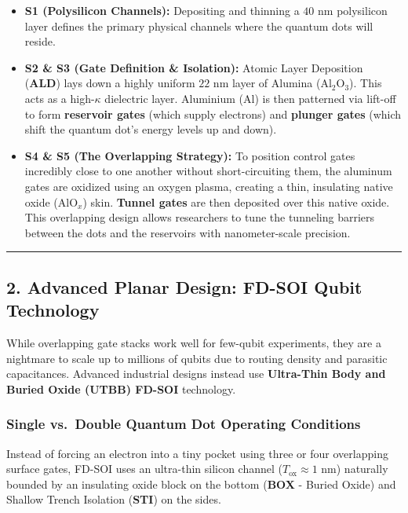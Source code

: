 \documentclass[
]{article}
\providecommand{\tightlist}{%
  \setlength{\itemsep}{0pt}\setlength{\parskip}{0pt}}
\begin{document}
\begin{itemize}
\tightlist
\item
  \textbf{S1 (Polysilicon Channels):} Depositing and thinning a
  \(40\text{ nm}\) polysilicon layer defines the primary physical
  channels where the quantum dots will reside.
\item
  \textbf{S2 \& S3 (Gate Definition \& Isolation):} Atomic Layer
  Deposition (\textbf{ALD}) lays down a highly uniform \(22\text{ nm}\)
  layer of Alumina (\(\text{Al}_2\text{O}_3\)). This acts as a
  high-\(\kappa\) dielectric layer. Aluminium (\(\text{Al}\)) is then
  patterned via lift-off to form \textbf{reservoir gates} (which supply
  electrons) and \textbf{plunger gates} (which shift the quantum dot's
  energy levels up and down).
\item
  \textbf{S4 \& S5 (The Overlapping Strategy):} To position control
  gates incredibly close to one another without short-circuiting them,
  the aluminum gates are oxidized using an oxygen plasma, creating a
  thin, insulating native oxide (\(\text{AlO}_x\)) skin. \textbf{Tunnel
  gates} are then deposited over this native oxide. This overlapping
  design allows researchers to tune the tunneling barriers between the
  dots and the reservoirs with nanometer-scale precision.
\end{itemize}

\begin{center}\rule{0.5\linewidth}{0.5pt}\end{center}

\subsection{2. Advanced Planar Design: FD-SOI Qubit
Technology}\label{advanced-planar-design-fd-soi-qubit-technology}

While overlapping gate stacks work well for few-qubit experiments, they
are a nightmare to scale up to millions of qubits due to routing density
and parasitic capacitances. Advanced industrial designs instead use
\textbf{Ultra-Thin Body and Buried Oxide (UTBB) FD-SOI} technology.

\subsubsection{Single vs.~Double Quantum Dot Operating
Conditions}\label{single-vs.-double-quantum-dot-operating-conditions}

Instead of forcing an electron into a tiny pocket using three or four
overlapping surface gates, FD-SOI uses an ultra-thin silicon channel
(\(T_{\text{ox}} \approx 1\text{ nm}\)) naturally bounded by an
insulating oxide block on the bottom (\textbf{BOX} - Buried Oxide) and
Shallow Trench Isolation (\textbf{STI}) on the sides.
\end{document}
